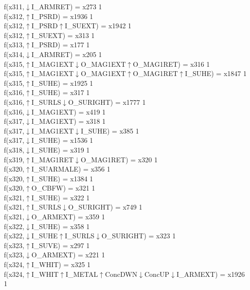 f(x311,$\downarrow$I\_ARMRET) = x273 {1} \\
f(x312,$\uparrow$I\_PSRD) = x1936 {1} \\
f(x312,$\uparrow$I\_PSRD$\uparrow$I\_SUEXT) = x1942 {1} \\
f(x312,$\uparrow$I\_SUEXT) = x313 {1} \\
f(x313,$\uparrow$I\_PSRD) = x177 {1} \\
f(x314,$\downarrow$I\_ARMRET) = x205 {1} \\
f(x315,$\uparrow$I\_MAG1EXT$\downarrow$O\_MAG1EXT$\uparrow$O\_MAG1RET) = x316 {1} \\
f(x315,$\uparrow$I\_MAG1EXT$\downarrow$O\_MAG1EXT$\uparrow$O\_MAG1RET$\uparrow$I\_SUHE) = x1847 {1} \\
f(x315,$\uparrow$I\_SUHE) = x1925 {1} \\
f(x316,$\uparrow$I\_SUHE) = x317 {1} \\
f(x316,$\uparrow$I\_SURLS$\downarrow$O\_SURIGHT) = x1777 {1} \\
f(x316,$\downarrow$I\_MAG1EXT) = x419 {1} \\
f(x317,$\downarrow$I\_MAG1EXT) = x318 {1} \\
f(x317,$\downarrow$I\_MAG1EXT$\downarrow$I\_SUHE) = x385 {1} \\
f(x317,$\downarrow$I\_SUHE) = x1536 {1} \\
f(x318,$\downarrow$I\_SUHE) = x319 {1} \\
f(x319,$\uparrow$I\_MAG1RET$\downarrow$O\_MAG1RET) = x320 {1} \\
f(x320,$\uparrow$I\_SUARMALE) = x356 {1} \\
f(x320,$\uparrow$I\_SUHE) = x1384 {1} \\
f(x320,$\uparrow$O\_CBFW) = x321 {1} \\
f(x321,$\uparrow$I\_SUHE) = x322 {1} \\
f(x321,$\uparrow$I\_SURLS$\downarrow$O\_SURIGHT) = x749 {1} \\
f(x321,$\downarrow$O\_ARMEXT) = x359 {1} \\
f(x322,$\downarrow$I\_SUHE) = x358 {1} \\
f(x322,$\downarrow$I\_SUHE$\uparrow$I\_SURLS$\downarrow$O\_SURIGHT) = x323 {1} \\
f(x323,$\uparrow$I\_SUVE) = x297 {1} \\
f(x323,$\downarrow$O\_ARMEXT) = x221 {1} \\
f(x324,$\uparrow$I\_WHIT) = x325 {1} \\
f(x324,$\uparrow$I\_WHIT$\uparrow$I\_METAL$\uparrow$ConcDWN$\downarrow$ConcUP$\downarrow$I\_ARMEXT) = x1926 {1} \\

